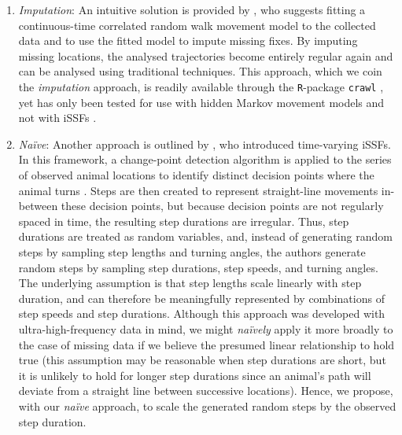 \documentclass[../FinalThesis.tex]{subfiles}
\begin{document}
\begin{enumerate}

  \item \textit{Imputation}: An intuitive solution is provided by
  \citet{McClintock.2017}, who suggests fitting a continuous-time correlated
  random walk movement model \citep{Johnson.2008} to the collected data and to
  use the fitted model to impute missing fixes. By imputing missing locations,
  the analysed trajectories become entirely regular again and can be analysed
  using traditional techniques. This approach, which we coin the
  \textit{imputation} approach, is readily available through the
  \texttt{R}-package \texttt{crawl} \citep{Johnson.2024}, yet has only been
  tested for use with hidden Markov movement models and not with iSSFs
  \citep{McClintock.2017}.

  \item \textit{Na\"ive}: Another approach is outlined by \citet{Munden.2021},
  who introduced time-varying iSSFs. In this framework, a change-point detection
  algorithm is applied to the series of observed animal locations to identify
  distinct decision points where the animal turns \citep{Potts.2018,
  Munden.2021}. Steps are then created to represent straight-line movements
  in-between these decision points, but because decision points are not
  regularly spaced in time, the resulting step durations are irregular. Thus,
  step durations are treated as random variables, and, instead of generating
  random steps by sampling step lengths and turning angles, the authors generate
  random steps by sampling step durations, step speeds, and turning angles. The
  underlying assumption is that step lengths scale linearly with step duration,
  and can therefore be meaningfully represented by combinations of step speeds
  and step durations. Although this approach was developed with
  ultra-high-frequency data in mind, we might \textit{na\"ively} apply it more
  broadly to the case of missing data if we believe the presumed
  linear relationship to hold true (this assumption may be reasonable when
  step durations are short, but it is unlikely to hold for longer step durations
  since an animal's path will deviate from a straight line between successive
  locations). Hence, we propose, with our \textit{na\"ive} approach, to scale the
  generated random steps by the observed step duration.


\end{enumerate}
\end{document}
